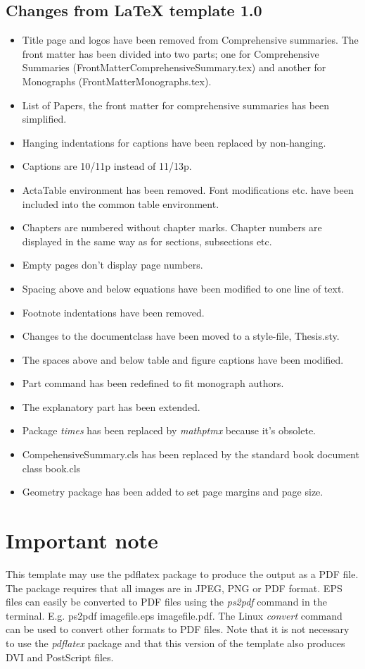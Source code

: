 \subsection{Changes from \LaTeX{} template 1.0}
\begin{itemize}
    \item Title page and logos have been removed from Comprehensive summaries. The front matter has been divided into two parts; one for Comprehensive Summaries (FrontMatterComprehensiveSummary.tex) and another for Monographs (FrontMatterMonographs.tex).
    \item List of Papers, the front matter for comprehensive summaries has been simplified.
    \item Hanging indentations for captions have been replaced by non-hanging.
    \item Captions are 10/11p instead of 11/13p.
    \item ActaTable environment has been removed. Font modifications etc. have been included into the common table environment.
    \item Chapters are numbered without chapter marks. Chapter numbers are displayed in the same way as for sections, subsections etc.
    \item Empty pages don't display page numbers.
    \item Spacing above and below equations have been modified to one line of text.
    \item Footnote indentations have been removed.
    \item Changes to the documentclass have been moved to a style-file, Thesis.sty.
    \item The spaces above and below table and figure captions have been modified.
    \item Part command has been redefined to fit monograph authors.
    \item The explanatory part has been extended.
    \item Package \emph{times} has been replaced by \emph{mathptmx} because it's obsolete.
    \item CompehensiveSummary.cls has been replaced by the standard book document class book.cls
    \item Geometry package has been added to set page margins and page size.
\end{itemize}

\section{Important note}
This template may use the pdflatex package to produce the output as a PDF file. The package requires that all images are in JPEG, PNG or PDF  format. EPS files can easily be converted to PDF files using the \emph{ps2pdf} command in the terminal. E.g. ps2pdf imagefile.eps imagefile.pdf. The Linux \emph{convert} command can be used to convert other formats to PDF files. Note that it is not necessary to use the \textit{pdflatex} package and that this version of the template also produces DVI and PostScript files.   

